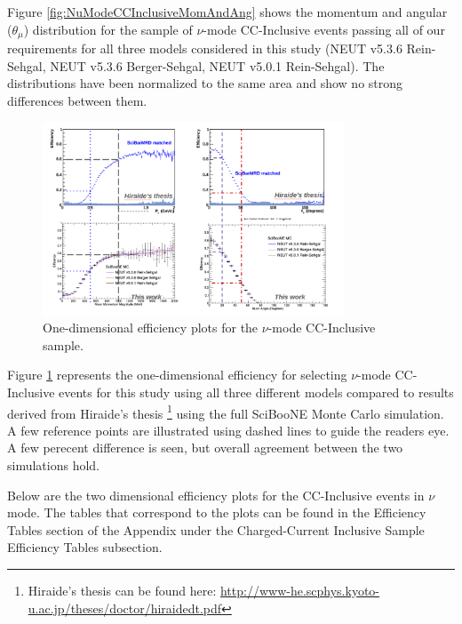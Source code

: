 \documentclass[11pt]{article}
\begin{document}
Figure \ref*{fig:NuModeCCInclusiveMomAndAng} shows the momentum and angular ($\theta_{\mu}$) distribution for the sample of $\nu$-mode CC-Inclusive events passing all of our requirements for all three models considered in this study (NEUT v5.3.6 Rein-Sehgal, NEUT v5.3.6 Berger-Sehgal, NEUT v5.0.1 Rein-Sehgal). The distributions have been normalized to the same area and show no strong differences between them. 

\begin{figure}[H]
\centering
\includegraphics[width=0.8\textwidth]{CCInclusivePlots/CC1DIncEff.png}
\caption{One-dimensional efficiency plots for the $\nu$-mode CC-Inclusive sample.}
\label{fig:OneDEfficiency}
\end{figure}

Figure \ref*{fig:OneDEfficiency} represents the one-dimensional efficiency for selecting $\nu$-mode CC-Inclusive events for this study using all three different models compared to results derived from Hiraide's thesis \footnote{Hiraide's thesis can be found here: \href{http://www-he.scphys.kyoto-u.ac.jp/theses/doctor/hiraide_dt.pdf}{http://www-he.scphys.kyoto-u.ac.jp/theses/doctor/hiraide\textunderscore{}dt.pdf}} using the full SciBooNE Monte Carlo simulation. A few reference points are illustrated using dashed lines to guide the readers eye. A few perecent difference is seen, but overall agreement between the two simulations hold.

Below are the two dimensional efficiency plots for the CC-Inclusive events in $\nu$ mode. The tables that correspond to the plots can be found in the Efficiency Tables section of the Appendix under the Charged-Current Inclusive Sample Efficiency Tables subsection.
\end{document}
